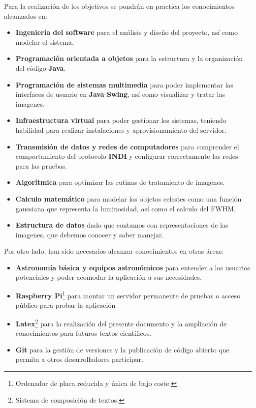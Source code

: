 \bigskip
Para la realización de los objetivos se pondrán en practica los conocimientos alcanzados en:

\begin{itemize}
  \item \textbf{Ingeniería del software} para el análisis y diseño del proyecto, así como modelar el sistema.
  \item \textbf{Programación orientada a objetos} para la estructura y la organización del código \textbf{Java}.
  \item \textbf{Programación de sistemas multimedia} para poder implementar las interfaces de usuario en \textbf{Java Swing}, así como visualizar y tratar las imagenes.
  \item \textbf{Infraestructura virtual} para poder gestionar los sistemas, teniendo habilidad para realizar instalaciones y aprovisionamiento del servidor.
  \item \textbf{Transmisión de datos y redes de computadores} para comprender el comportamiento del protocolo \textbf{INDI} y configurar correctamente las redes para las pruebas.
  \item \textbf{Algorítmica} para optimizar las rutinas de tratamiento de imagenes.
  \item \textbf{Calculo matemático} para modelar los objetos celestes como una función gaussiana que representa la luminosidad, así como el calculo del FWHM.
  \item \textbf{Estructura de datos} dado que contamos con representaciones de las imagenes, que debemos conocer y saber manejar.


\end{itemize}

\bigskip
Por otro lado, han sido necesarios alcanzar conocimientos en otras áreas:

\begin{itemize}

  \item \textbf{Astronomía básica y equipos astronómicos} para entender a los usuarios potenciales y poder acomodar la aplicación a sus necesidades.
  \item \textbf{Raspberry Pi}\footnote{Ordenador de placa reducida y única de bajo coste.} para montar un servidor permanente de pruebas o acceso público para probar la aplicación
  \item \textbf{Latex}\footnote{Sistema de composición de textos.} para la realización del presente documento y la ampliación de conocimientos para futuros textos científicos.
  \item \textbf{Git} para la gestión de versiones y la publicación de código abierto que permita a otros desarrolladores participar.
\end{itemize}
